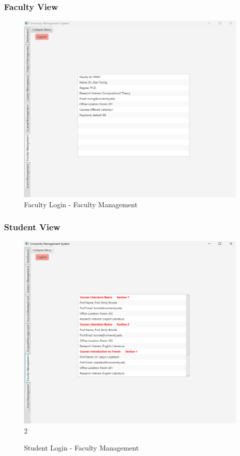 \lipsum[9]

\subsubsection{Faculty View}

\lipsum[9]

\begin{figure}[ht!]
    \centering
        \centering\includegraphics[width=0.7\linewidth]{figures/FAC_Faculty_Management_Tab.png}
        \caption{Faculty Login - Faculty Management}
\end{figure}


\subsubsection{Student View}

\lipsum[9]

\begin{figure}[ht!]
    \centering
        \centering\includegraphics[width=0.8\linewidth]{figures/STD_Faculty_Tab.png}
2        \caption{Student Login - Faculty Management}
\end{figure}


